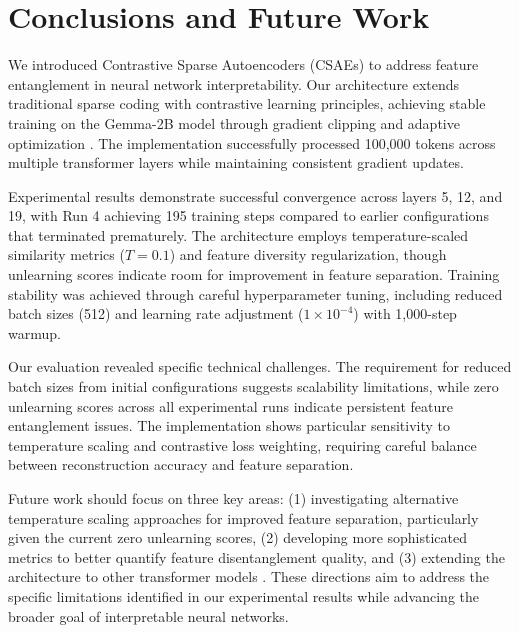 \documentclass{article} %
\begin{document}
\section{Conclusions and Future Work}
\label{sec:conclusion}

We introduced Contrastive Sparse Autoencoders (CSAEs) to address feature entanglement in neural network interpretability. Our architecture extends traditional sparse coding \cite{goodfellow2016deep} with contrastive learning principles, achieving stable training on the Gemma-2B model through gradient clipping and adaptive optimization \cite{kingma2014adam}. The implementation successfully processed 100,000 tokens across multiple transformer layers while maintaining consistent gradient updates.

Experimental results demonstrate successful convergence across layers 5, 12, and 19, with Run 4 achieving 195 training steps compared to earlier configurations that terminated prematurely. The architecture employs temperature-scaled similarity metrics ($T=0.1$) and feature diversity regularization, though unlearning scores indicate room for improvement in feature separation. Training stability was achieved through careful hyperparameter tuning, including reduced batch sizes (512) and learning rate adjustment ($1 \times 10^{-4}$) with 1,000-step warmup.

Our evaluation revealed specific technical challenges. The requirement for reduced batch sizes from initial configurations suggests scalability limitations, while zero unlearning scores across all experimental runs indicate persistent feature entanglement issues. The implementation shows particular sensitivity to temperature scaling and contrastive loss weighting, requiring careful balance between reconstruction accuracy and feature separation.

Future work should focus on three key areas: (1) investigating alternative temperature scaling approaches for improved feature separation, particularly given the current zero unlearning scores, (2) developing more sophisticated metrics to better quantify feature disentanglement quality, and (3) extending the architecture to other transformer models \cite{vaswani2017attention}. These directions aim to address the specific limitations identified in our experimental results while advancing the broader goal of interpretable neural networks.
\end{document}
